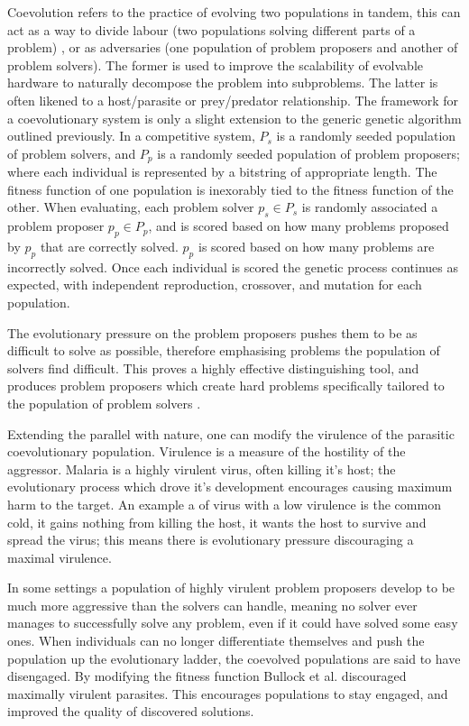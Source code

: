 Coevolution refers to the practice of evolving two populations in tandem, this can
act as a way to divide labour (two populations solving different parts of a problem)
 \cite{Potter:2000:CCA:1108888.1108890},
or as adversaries (one population of problem proposers and another of problem solvers).
The former is used to improve the scalability of evolvable hardware to naturally
decompose the problem into subproblems.
The latter is often likened to a host/parasite or prey/predator relationship.
The framework for a coevolutionary system is only a slight extension to the
generic genetic algorithm outlined previously. In a competitive system, $P_s$ is a randomly
seeded population of problem solvers, and $P_p$ is a randomly seeded population
of problem proposers; where each individual is represented by a bitstring of
appropriate length. The fitness function of one population is inexorably tied to
the fitness function of the other.
When evaluating, each problem solver $p_s \in P_s$ is randomly associated
a problem proposer $p_p \in P_p$, and is scored based on how many problems proposed by
$p_p$ that are correctly solved. $p_p$ is scored based on how many problems
are incorrectly solved. Once each individual is scored the genetic process continues as expected,
with independent reproduction, crossover, and mutation for each population.

The evolutionary pressure on the problem proposers pushes them to be as difficult
to solve as possible, therefore emphasising problems the population of solvers
find difficult. This proves a highly effective distinguishing tool, and produces
problem proposers which create hard problems specifically tailored to the population
of problem solvers \cite{HILLIS1990228}.

Extending the parallel with nature, one can modify the virulence of the parasitic
coevolutionary population. Virulence is a measure of the hostility of the aggressor.
Malaria is a highly virulent virus, often killing it's host; the evolutionary
process which drove it's development encourages causing maximum harm to the target.
An example a of virus with a low virulence is the common cold, it gains nothing from
killing the host, it wants the host to survive and spread the virus; this means
there is evolutionary pressure discouraging a maximal virulence.

In some settings a population of highly virulent problem proposers develop to be much more
aggressive than the solvers can handle, meaning no solver ever manages to
successfully solve any problem, even if it could have solved some easy ones.
When individuals can no longer
differentiate themselves and push the population up the evolutionary ladder,
the coevolved populations are said to have disengaged.
By modifying the fitness function Bullock et al. \cite{6790490}
discouraged maximally
virulent parasites. This encourages populations to stay engaged, and improved the
quality of discovered solutions.

